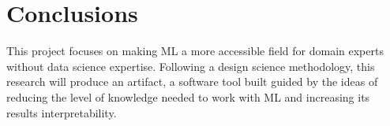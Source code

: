\documentclass[runningheads]{llncs}
\begin{document}
	\section{Conclusions}
	
	This project focuses on making ML a more accessible field for domain experts without data science expertise. 
	Following a design science methodology, this research will produce an artifact, a software tool built
	guided by the ideas of reducing the level of knowledge needed to work with ML and increasing its
	results interpretability. 
	
	
	
	
	
	
	
	
\end{document}
